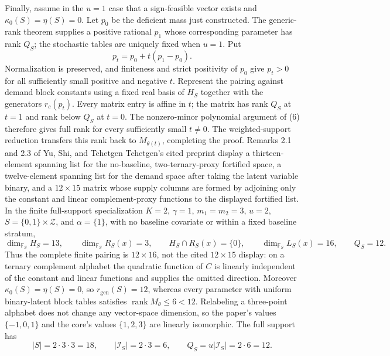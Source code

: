 Finally, assume in the \(u=1\) case that a sign-feasible vector exists and \(\kappa_0(S)=\eta(S)=0\).  Let \(p_0\) be the deficient mass just constructed.  The generic-rank theorem supplies a positive rational \(p_1\) whose corresponding parameter has rank \(Q_S\); the stochastic tables are uniquely fixed when \(u=1\).  Put
\[
p_t=p_0+t(p_1-p_0).
\tag{12}
\]
Normalization is preserved, and finiteness and strict positivity of \(p_0\) give \(p_t>0\) for all sufficiently small positive and negative \(t\).  Represent the pairing against demand block constants using a fixed real basis of \(H_S\) together with the generators \(r_c(p_t)\).  Every matrix entry is affine in \(t\); the matrix has rank \(Q_S\) at \(t=1\) and rank below \(Q_S\) at \(t=0\).  The nonzero-minor polynomial argument of (6) therefore gives full rank for every sufficiently small \(t\neq0\).  The weighted-support reduction transfers this rank back to \(M_{\theta(t)}\), completing the proof.
Remarks 2.1 and 2.3 of Yu, Shi, and Tchetgen Tchetgen's cited preprint display a thirteen-element spanning list for the no-baseline, two-ternary-proxy fortified space, a twelve-element spanning list for the demand space after taking the latent variable binary, and a \(12\times15\) matrix whose supply columns are formed by adjoining only the constant and linear complement-proxy functions to the displayed fortified list.
In the finite full-support specialization \(K=2\), \(\gamma=1\), \(m_1=m_2=3\), \(u=2\), \(S=\{0,1\}\times\mathcal Z\), and \(\alpha=\{1\}\), with no baseline covariate or within a fixed baseline stratum,
\[
\dim_{\mathbb F_S}H_S=13,
\qquad
\dim_{\mathbb F_S}R_S(x)=3,
\qquad
H_S\cap R_S(x)=\{0\},
\qquad
\dim_{\mathbb F_S}L_S(x)=16,
\qquad
Q_S=12.
\]
Thus the complete finite pairing is \(12\times16\), not the cited \(12\times15\) display: on a ternary complement alphabet the quadratic function of \(C\) is linearly independent of the constant and linear functions and supplies the omitted direction.  Moreover \(\kappa_0(S)=\eta(S)=0\), so \(r_{\mathrm{gen}}(S)=12\), whereas every parameter with uniform binary-latent block tables satisfies \(\operatorname{rank}M_\theta\leq6<12\).
Relabeling a three-point alphabet does not change any vector-space dimension, so the paper's values \(\{-1,0,1\}\) and the core's values \(\{1,2,3\}\) are linearly isomorphic.  The full support has
\[
|S|=2\cdot3\cdot3=18,
\qquad
|\mathcal I_S|=2\cdot3=6,
\qquad
Q_S=u|\mathcal I_S|=2\cdot6=12.
\tag{13}
\]

